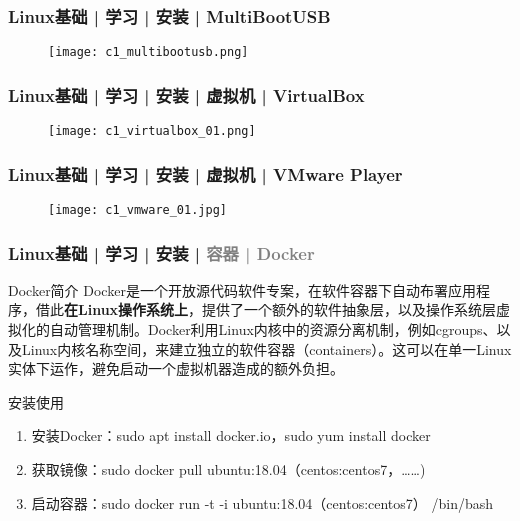 \begin{frame}
  \frametitle{Linux基础 | 学习 | 安装 | MultiBootUSB}
  \begin{figure}
    \centering
    \texttt{[image: c1\_multibootusb.png]}
  \end{figure}
\end{frame}

\begin{frame}
  \frametitle{Linux基础 | 学习 | 安装 | 虚拟机 | VirtualBox}
  \begin{figure}
    \centering
    \texttt{[image: c1\_virtualbox\_01.png]}
  \end{figure}
\end{frame}

\begin{frame}
  \frametitle{Linux基础 | 学习 | 安装 | 虚拟机 | VMware Player}
  \begin{figure}
    \centering
    \texttt{[image: c1\_vmware\_01.jpg]}
  \end{figure}
\end{frame}

\begin{frame}
  \frametitle{Linux基础 | 学习 | 安装 | \textcolor{gray}{容器 | Docker}}
  \begin{block}{Docker简介}
    Docker是一个开放源代码软件专案，在软件容器下自动布署应用程序，借此\textbf{在Linux操作系统上}，提供了一个额外的软件抽象层，以及操作系统层虚拟化的自动管理机制。Docker利用Linux内核中的资源分离机制，例如cgroups、以及Linux内核名称空间，来建立独立的软件容器（containers）。这可以在单一Linux实体下运作，避免启动一个虚拟机器造成的额外负担。
  \end{block}
  \pause
  \begin{block}{安装使用}
    \begin{enumerate}
      \item 安装Docker：sudo apt install docker.io，sudo yum install docker
      \item 获取镜像：sudo docker pull ubuntu:18.04（centos:centos7，……)
      \item 启动容器：sudo docker run -t -i ubuntu:18.04（centos:centos7） /bin/bash
    \end{enumerate}
  \end{block}
\end{frame}

